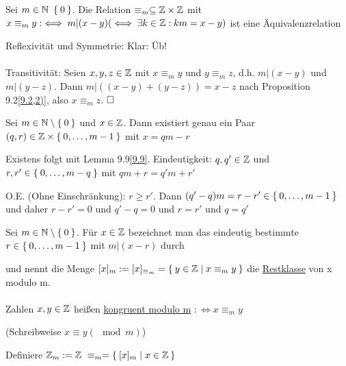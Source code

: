 \documentclass{../../meta/tudscript}
\begin{document}
            Sei $m \in \mathbb{N} \ \Set{0}$. Die Relation $\equiv_m \subseteq \mathbb{Z} \times \mathbb{Z}$ mit $x \equiv_m y :\iff m|(x-y) (\iff \exists k \in \mathbb{Z}: km=x-y)$ ist
            eine Äquivalenzrelation
            
                Reflexivität und Symmetrie: Klar: Üb!
		\paragraph{}
                Transitivität: Seien $x,y,z \in \mathbb{Z}$ mit $x \equiv_m y$ und $y \equiv_m z$, d.h. $m|(x-y)$ und $m|(y-z)$.
		Dann $m|((x-y)+(y-z)) = x-z$ nach Proposition 9.2\ref{9.2,2)}, also $x \equiv_m z$.
                $\hfill\square$

            Sei $m \in \mathbb{N} \setminus \Set{0}$ und $x \in \mathbb{Z}$. Dann existiert genau ein Paar $(q,r) \in \mathbb{Z} \times \Set{0, \ldots, m-1}$ mit $x = qm -r$
            
                Existens folgt mit Lemma 9.9\ref{9.9}. Eindeutigkeit: $q, q' \in \mathbb{Z}$ und $r, r' \in \Set{0, \ldots, m-q}$ mit $qm+r = q'm +r'$
                
                O.E. (Ohne Einschränkung): $r \geq r'$. Dann $(q'-q)m = r -r' \in \Set{0, \ldots, m-1}$ und daher $r-r' = 0$ und $q'-q = 0$ und $r = r'$ und $q = q'$
                
            Sei $m \in \mathbb{N} \setminus \Set{0}$. Für $x \in \mathbb{Z}$ bezeichnet man das eindeutig bestimmte $r \in \Set{0, \ldots, m-1}$ mit $m|(x-r)$ durch


            und nennt die Menge $[x]_m := [x]_{\equiv_m} = \Set{y \in \mathbb{Z}\mid x \equiv_m y}$ die \underline{Restklasse} von x modulo m.

	    \paragraph{}
            Zahlen $x,y \in \mathbb{Z}$ heißen \underline{kongruent modulo m} $:\iff x \equiv_m y$

            (Schreibweise $x \equiv y (\mod m)$)

            Definiere $\mathbb{Z}_m := \mathbb{Z} \ \equiv_m = \Set{[x]_m \mid x \in \mathbb{Z}}$
\end{document}
